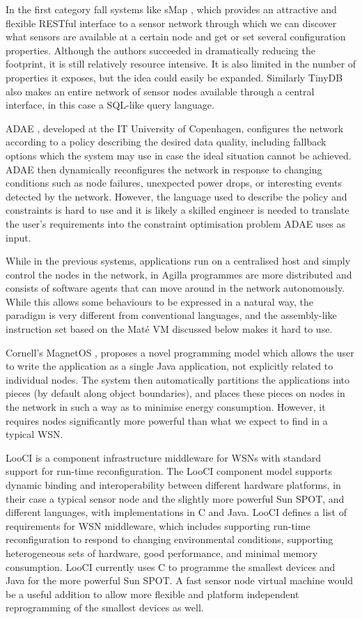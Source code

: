 In the first category fall systems like sMap \cite{DawsonHaggerty:2010eo}, which provides an attractive and flexible RESTful interface to a sensor network through which we can discover what sensors are available at a certain node and get or set several configuration properties. Although the authors succeeded in dramatically reducing the footprint, it is still relatively resource intensive. It is also limited in the number of properties it exposes, but the idea could easily be expanded. Similarly TinyDB \cite{Madden:2005tj} also makes an entire network of sensor nodes available through a central interface, in this case a SQL-like query language.

ADAE \cite{Chang:2010ek}, developed at the IT University of Copenhagen, configures the network according to a policy describing the desired data quality, including fallback options which the system may use in case the ideal situation cannot be achieved. ADAE then dynamically reconfigures the network in response to changing conditions such as node failures, unexpected power drops, or interesting events detected by the network. However, the language used to describe the policy and constraints is hard to use and it is likely a skilled engineer is needed to translate the user's requirements into the constraint optimisation problem ADAE uses as input.

While in the previous systems, applications run on a centralised host and simply control the nodes in the network, in Agilla \cite{Fok:2005bh} programmes are more distributed and consists of software agents that can move around in the network autonomously. While this allows some behaviours to be expressed in a natural way, the paradigm is very different from conventional languages, and the assembly-like instruction set based on the Maté VM \cite{Levis:2002ku} discussed below makes it hard to use.

Cornell's MagnetOS \cite{Liu:2005wsa}, proposes a novel programming model which allows the user to write the application as a single Java application, not explicitly related to individual nodes. The system then automatically partitions the applications into pieces (by default along object boundaries), and places these pieces on nodes in the network in such a way as to minimise energy consumption. However, it requires nodes significantly more powerful than what we expect to find in a typical WSN.

LooCI \cite{Hughes:dg} is a component infrastructure middleware for WSNs with standard support for run-time reconfiguration. The LooCI component model supports dynamic binding and interoperability between different hardware platforms, in their case a typical sensor node and the slightly more powerful Sun SPOT, and different languages, with implementations in C and Java. LooCI defines a list of requirements for WSN middleware, which includes supporting run-time reconfiguration to respond to changing environmental conditions, supporting heterogeneous sets of hardware, good performance, and minimal memory consumption. LooCI currently uses C to programme the smallest devices and Java for the more powerful Sun SPOT. A fast sensor node virtual machine would be a useful addition to allow more flexible and platform independent reprogramming of the smallest devices as well.

